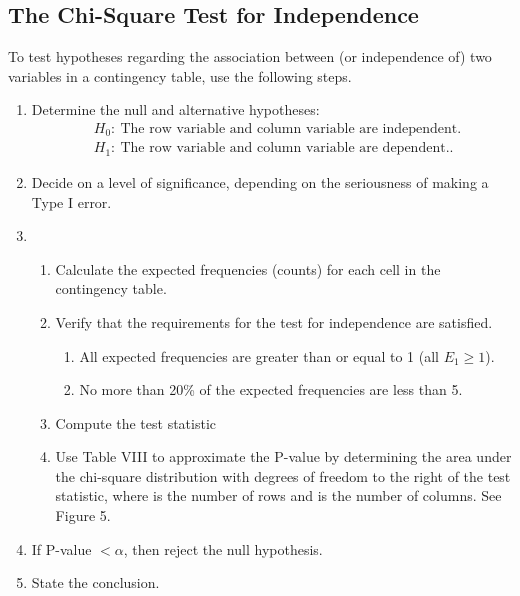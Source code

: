 \documentclass{report}
\begin{document}
    \subsection*{The Chi-Square Test for Independence}
    \bigbreak \noindent 
            To test hypotheses regarding the association between (or independence of) two variables in a contingency table, use the following steps.
        \begin{enumerate}
            \item  Determine the null and alternative hypotheses:
                \begin{align*}
                    &H_{0}:\ \text{The row variable and column variable are independent.} \\
                    &H_{1}:\ \text{The row variable and column variable are dependent.}
                .\end{align*}
            \item Decide on a level of significance, depending on the seriousness of making a Type I error.
            \item \begin{enumerate}
                    \item  Calculate the expected frequencies (counts) for each cell in the contingency table.
                    \item  Verify that the requirements for the test for independence are satisfied.
                        \begin{enumerate}
                            \item All expected frequencies are greater than or equal to 1  (all $E_{1} \geq1$).
                            \item No more than 20\% of the expected frequencies are less than 5.
                        \end{enumerate}
                    \item  Compute the test statistic
                    \item  Use Table VIII to approximate the P-value by determining the area under the chi-square distribution with degrees of freedom to the right of the test statistic, where is the number of rows and is the number of columns. See Figure 5.

            \end{enumerate}
            \item If P-value $< \alpha$, then reject the null hypothesis.
            \item State the conclusion.
        \end{enumerate}
\end{document}
